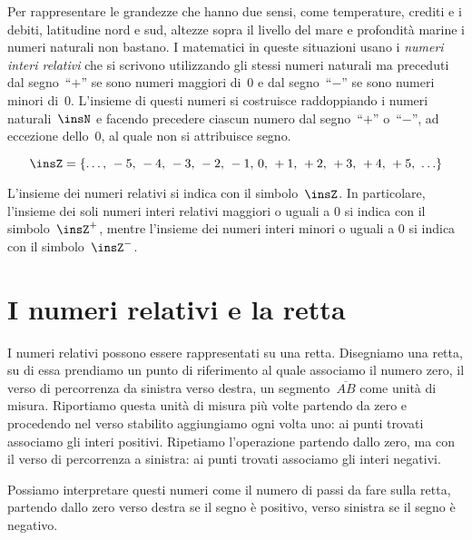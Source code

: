 Per rappresentare le grandezze che hanno due sensi, come temperature, crediti e i debiti, latitudine nord e sud,
altezze sopra il livello del mare e profondità marine i numeri naturali non bastano. I matematici in queste
situazioni usano i \emph{numeri interi relativi} che si scrivono utilizzando gli stessi numeri naturali ma preceduti
dal segno~``$+$'' se sono numeri maggiori di~0 e dal segno~``$-$'' se sono numeri minori di~0. L'insieme di questi numeri
si costruisce raddoppiando i numeri naturali~$\insN$ e facendo precedere ciascun numero dal segno~``$+$'' o~``$-$'',
ad eccezione dello~0, al quale non si attribuisce segno.

\[ \insZ=\lbrace\ldots\text{,~}-5\text{,~}-4\text{,~}-3\text{,~}-2\text{,~}-1\text{,~}0\text{,~}+1\text{,~}+2\text{,~}+3\text{,~}+4\text{,~}+5\text{,~}\ldots\rbrace \]

L'insieme dei numeri relativi si indica con il simbolo~$\insZ$. In particolare, l'insieme dei soli numeri interi relativi maggiori o uguali a 0
si indica con il simbolo~$\insZ^+$, mentre 
l'insieme dei numeri interi minori o uguali a 0 si indica con il simbolo~$\insZ^-$.

\section{I numeri relativi e la retta}

I numeri relativi possono essere rappresentati su una retta. Disegniamo una retta, su di essa prendiamo
un punto di riferimento al quale associamo il numero zero, il verso di percorrenza da sinistra verso destra,
un segmento~$\overline{AB}$ come unità di misura. Riportiamo questa unità di misura più volte partendo da zero e
procedendo nel verso stabilito aggiungiamo ogni volta uno: ai punti trovati associamo gli interi positivi.
Ripetiamo l'operazione partendo dallo zero, ma con il verso di percorrenza a sinistra: ai punti trovati associamo
gli interi negativi.

\begin{center}
 
\end{center}

Possiamo interpretare questi numeri come il numero di passi da fare sulla retta, partendo dallo zero verso
destra se il segno è positivo, verso sinistra se il segno è negativo.

